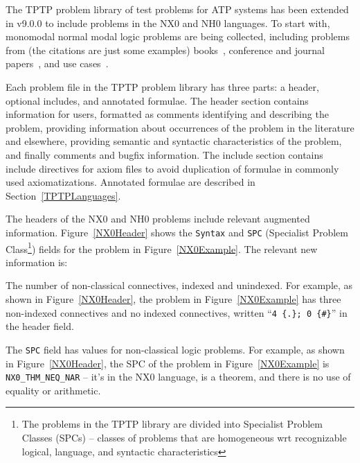 \documentclass{ceurart}
\newenvironment{packed_itemize}{
\vspace*{-0.3em}
\begin{itemize}
\setlength{\partopsep}{0pt}
\setlength{\itemsep}{1pt}
\setlength{\parskip}{0pt}
\setlength{\parsep}{0pt}
}{\end{itemize}}
\begin{document}
The TPTP problem library of test problems for ATP systems has been extended in v9.0.0 to include
problems in the NX0 and NH0 languages.
To start with, monomodal normal modal logic problems are being collected, including problems 
from (the citations are just some examples)
books~\cite{For94,FM98,Gir00,Sid10}, 
conference and journal papers~\cite{Rei92,FH+98,Sto00,PN+21}, 
and 
use cases~\cite{BW14-ECAI,MR22}.

Each problem file in the TPTP problem library has three parts: a header, optional includes, and 
annotated formulae. 
The header section contains information for users, formatted as comments identifying and 
describing the problem, providing information about occurrences of the problem in the literature 
and elsewhere, providing semantic and syntactic characteristics of the problem, and finally
comments and bugfix information. 
The include section contains include directives for axiom files to avoid duplication of formulae 
in commonly used axiomatizations. 
Annotated formulae are described in Section~\ref{TPTPLanguages}.

The headers of the NX0 and NH0 problems include relevant augmented information.
Figure~\ref{NX0Header} shows the {\tt Syntax} and {\tt SPC} (Specialist Problem Class\footnote{%
The problems in the TPTP library are divided into Specialist Problem Classes (SPCs) – classes 
of problems that are homogeneous wrt recognizable logical, language, and syntactic
characteristics}) fields for the problem in Figure~\ref{NX0Example}.
The relevant new information is:
\begin{packed_itemize}
\item The number of non-classical connectives, indexed and unindexed.
      For example, as shown in Figure~\ref{NX0Header}, the problem in Figure~\ref{NX0Example} 
      has three non-indexed connectives and no indexed connectives, written 
      ``{\tt 4 \{.\};   0 \{\#\}}'' in the header field.
\item The {\tt SPC} field has values for non-classical logic problems. 
      For example, as shown in Figure~\ref{NX0Header}, the SPC of the problem in 
      Figure~\ref{NX0Example} is {\tt NX0\_THM\_NEQ\_NAR} -- it's in the NX0 language, is a 
      theorem, and there is no use of equality or arithmetic.
\end{packed_itemize}
\end{document}
